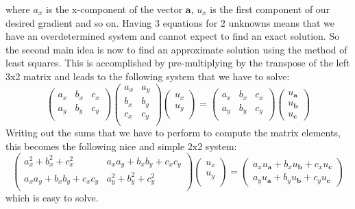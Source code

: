 where $a_x$ is the x-component of the vector $\mathbf{a}$, $u_x$ is the first component of our desired gradient and so on. Having 3 equations for 2 unknowns means that we have an overdetermined system and cannot expect to find an exact solution. So the second main idea is now to find an approximate solution using the method of least squares. This is accomplished by pre-multiplying by the transpose of the left 3x2 matrix and leads to the following system that we have to solve:
\begin{equation}
\begin{pmatrix}
a_x & b_x & c_x  \\
a_y & b_y & c_y  \\
\end{pmatrix}
\begin{pmatrix}
a_x & a_y  \\
b_x & b_y  \\
c_x & c_y  \\
\end{pmatrix}
\begin{pmatrix}
u_x  \\
u_y  \\
\end{pmatrix}
=
\begin{pmatrix}
a_x & b_x & c_x  \\
a_y & b_y & c_y  \\
\end{pmatrix}
\begin{pmatrix}
u_{\mathbf{a}}  \\
u_{\mathbf{b}}  \\
u_{\mathbf{c}}
\end{pmatrix}
\end{equation}
Writing out the sums that we have to perform to compute the matrix elements, this becomes the following nice and simple 2x2 system:
\begin{equation}
\begin{pmatrix}
	a_x^2 + b_x^2 + c_x^2 & a_x a_y + b_x b_y + c_x c_y \\
 a_x a_y + b_x b_y + c_x c_y & a_y^2 + b_y^2 + c_y^2  \\
\end{pmatrix}
\begin{pmatrix}
u_x  \\
u_y  \\
\end{pmatrix}
= 
\begin{pmatrix}
a_x u_{\mathbf{a}} + b_x u_{\mathbf{b}} + c_x u_{\mathbf{c}} \\
a_y u_{\mathbf{a}} + b_y u_{\mathbf{b}} + c_y u_{\mathbf{c}}
\end{pmatrix}
\end{equation}
which is easy to solve.

